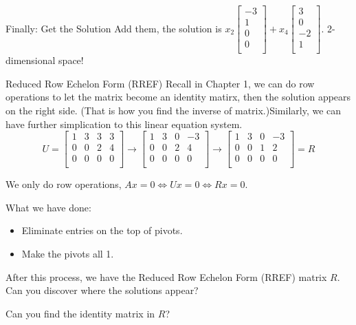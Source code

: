 \documentclass{beamer}
\begin{document}
\begin{frame}{Finally: Get the Solution}
\vspace{3pt}
Add them, the solution is $x_2\left[ \begin{array}{c}
	-3\\
	1\\
	0\\
	0\\
\end{array} \right] +x_4\left[ \begin{array}{c}
	3\\
	0\\
	-2\\
	1\\
\end{array} \right]$. 2-dimensional space!
\end{frame}

\begin{frame}{Reduced Row Echelon Form (RREF)}
Recall in Chapter 1, we can do row operations to let the matrix become an identity matirx, then the solution appears on the right side. (That is how you find the inverse of matrix.)Similarly, we can have further simplication to this linear equation system.
\begin{equation*}
    U=\left[ \begin{matrix}
        1&		3&		3&		3\\
        0&		0&		2&		4\\
        0&		0&		0&		0\\
    \end{matrix} \right] \rightarrow \left[ \begin{matrix}
        1&		3&		0&		-3\\
        0&		0&		2&		4\\
        0&		0&		0&		0\\
    \end{matrix} \right] \rightarrow \left[ \begin{matrix}
        1&		3&		0&		-3\\
        0&		0&		1&		2\\
        0&		0&		0&		0\\
    \end{matrix} \right] =R
\end{equation*}

We only do row operations, $Ax=0\Leftrightarrow Ux=0\Leftrightarrow Rx=0$.

What we have done:
\begin{itemize}
    \item Eliminate entries on the top of pivots.
    \item Make the pivots all 1.
\end{itemize}

After this process, we have the Reduced Row Echelon Form (RREF) matrix $R$. Can you discover where the solutions appear?

\vspace{3pt}
Can you find the identity matrix in $R$?

\end{frame}
\end{document}
